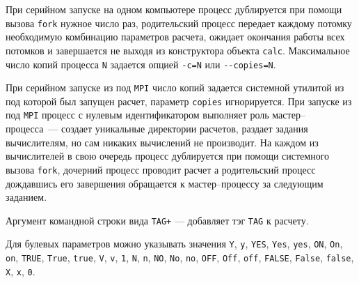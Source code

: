 При серийном запуске на одном компьютере процесс дублируется при помощи вызова \verb'fork' нужное число раз, родительский процесс
передает каждому потомку необходимую комбинацию параметров расчета,
ожидает окончания работы всех потомков и завершается не выходя из конструктора объекта \verb'calc'. Максимальное число копий
процесса \verb'N' задается опцией \verb'-c=N' или \verb'--copies=N'.

При серийном запуске из под \verb'MPI' число копий задается
системной утилитой из под которой был запущен расчет, параметр \verb'copies' игнорируется. При запуске из под \verb'MPI'
процесс с нулевым идентификатором выполняет роль мастер--процесса~--- создает уникальные директории расчетов, раздает задания вычислителям, но
сам никаких вычислений не производит. На каждом из вычислителей в свою очередь процесс дублируется при помощи системного вызова \verb'fork',
дочерний процесс проводит расчет а родительский процесс дождавшись его завершения обращается к мастер--процессу за следующим заданием.

Аргумент командной строки вида \verb'TAG+' --- добавляет тэг \verb'TAG' к расчету. 

Для булевых параметров можно указывать значения
\verb'Y', \verb'y', \verb'YES', \verb'Yes', \verb'yes', \verb'ON',  \verb'On',  \verb'on',  \verb'TRUE',  \verb'True',  \verb'true',  \verb'V', \verb'v', \verb'1', 
\verb'N', \verb'n', \verb'NO',  \verb'No',  \verb'no',  \verb'OFF', \verb'Off', \verb'off', \verb'FALSE', \verb'False', \verb'false', \verb'X', \verb'x', \verb'0'.

